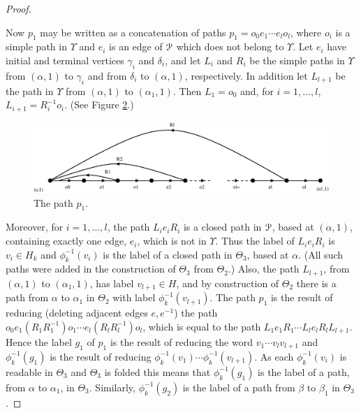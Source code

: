 \documentclass[a4paper,12pt]{article}
\renewcommand{\a}{\alpha }
\renewcommand{\b}{\beta }
\newcommand{\g}{\gamma }
\renewcommand{\d}{\delta }
\newcommand{\T}{\Theta }
\newcommand{\U}{\Upsilon }
\newcommand{\cP}{{\cal{P}}}
\numberwithin{equation}{section}
\numberwithin{figure}{section}
\begin{document}
\begin{proof}
\begin{figure}
\label{fig:nf-1}
\end{figure}
Now $p_1$ may
be written as a concatenation of paths $p_1=o_0e_1\cdots e_l o_{l}$,
where $o_i$ is a simple path in $\U$ and $e_i$ is an edge of $\cP$ which does
not belong to $\U$.  Let $e_i$ have initial and terminal vertices
$\g_i$ and $\d_i$, and let $L_i$ and $R_i$ be the simple paths in $\U$ from
$(\a,1)$ to $\g_i$ and from $\d_i$ to $(\a,1)$, respectively.
In addition let $L_{l+1}$ be the path in $\U$ from $(\a,1)$ to
$(\a_1,1)$.
Then $L_1=o_0$ and, for $i=1,\ldots ,l$, $L_{i+1}=R_i^{-1}o_{i}$.
(See Figure \ref{fig:LeR}.)
\begin{figure}
\begin{center}
\psfrag{(a,1)}{$(\a,1)$}
\psfrag{(a1,1)}{$(\a_1,1)$}
\includegraphics[scale=.4]{LeR.eps}
\end{center}
\caption{The path $p_1$.}
\label{fig:LeR}
\end{figure}
Moreover, for $i=1,\ldots ,l$,
the path $L_i e_i R_i$ is a closed path in $\cP$, based
at $(\a,1)$, containing exactly one edge, $e_i$, which is not in $\U$.
Thus the label of  $L_i e_i R_i$ is $v_i\in H_k$ and $\phi_k^{-1}(v_i)$ is the
label of a closed path in $\T_3$, based at  $\a$. (All such paths
were added in the construction of $\T_3$ from $\T_2$.)
Also, the path $L_{l+1}$, from $(\a,1)$ to $(\a_1,1)$, has
label $v_{l+1}\in H$,
and by construction of $\T_2$ there is a path from $\a$ to
$\a_1$ in $\T_2$ with label $\phi_k^{-1}(v_{l+1})$.
The path
$p_1$ is the result of reducing (deleting adjacent edges $e,e^{-1}$) the path
$o_0 e_1 (R_1 R_1^{-1}) o_1 \cdots e_{l}(R_l R_l^{-1}) o_{l}$, which
is equal to the path $L_1 e_1 R_1 \cdots L_l e_l R_l L_{l+1}$. Hence the label $g_1$
of $p_1$ is the result of
reducing the word $v_1\cdots v_l v_{l+1}$
 and $\phi_k^{-1}(g_1)$ is the result of
reducing $\phi_k^{-1}(v_1) \cdots \phi_k^{-1}(v_{l+1})$. As each $\phi_k^{-1}(v_i)$ is readable
in $\T_3$ and $\T_3$ is folded this means  that $\phi_k^{-1}(g_1)$ is the
label of a path, from $\a$ to   $\a_1$, in $\T_3$. Similarly,
$\phi_k^{-1}(g_2)$
is the label of a path from $\b$ to $\b_1$ in $\T_3$.


\end{proof}
\end{document}
